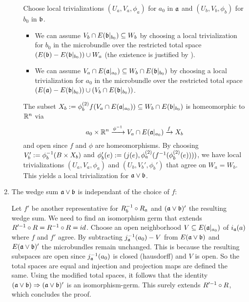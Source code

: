 \begin{myproof}
\begin{enumerate}
\begin{itemize}
            Choose local trivializations $(U_a, V_a, \phi_a)$ for $a_0$ in $\mathfrak{a}$ and $(U_b, V_b, \phi_b)$ for $b_0$ in $\mathfrak{b}$.
            \begin{itemize}
                \item We can assume $V_b \cap E(\mathfrak{b}\vert_{b_0}) \subseteq{} W_b$ by choosing a local trivialization for $b_0$ in
                the microbundle over the restricted total space $(E(\mathfrak{b}) - E(\mathfrak{b}\vert_{b_0})) \cup W_a$ (the existence is justified by ).
                \item We can assume $V_a \cap E(\mathfrak{a}\vert_{a_0}) \subseteq{} W_b \cap E(\mathfrak{b}\vert_{b_0})$ by choosing a local trivialization for $a_0$ in
                the microbundle over the restricted total space $(E(\mathfrak{a}) - E(\mathfrak{b}\vert_{b_0})) \cup (V_b \cap E(\mathfrak{b}\vert_{b_0}))$.
            \end{itemize}
            The subset $X_b := \phi_b^{(2)}f(V_a \cap E(\mathfrak{a}\vert_{a_0})) \subseteq{} W_b \cap E(\mathfrak{b}\vert_{b_0})$ is homeomorphic to $\mathbb{R}^n$ via
            \[ a_0 \times \mathbb{R}^n \xrightarrow{\phi^{-1}} V_a \cap E(\mathfrak{a}\vert_{a_0}) \xrightarrow{f} X_b \]
            and open since $f$ and $\phi$ are homeomorphisms.
            By choosing $V_b' := \phi_b^{-1}(B \times X_b)$ and $\phi_b'(e) := (j(e), \phi_a^{(2)}(f^{-1}(\phi_b^{(2)}(e))))$,
            we have local trivializations $(U_a, V_a, \phi_a)$ and $(U_b, V_b', \phi_b')$ that agree on $W_a = W_b$.
            This yields a local trivialization for $\mathfrak{a} \vee \mathfrak{b}$.
        \end{itemize}
        \item The wedge sum $\mathfrak{a} \vee \mathfrak{b}$ is independant of the choice of $f$:

        Let $f'$ be another representative for $R_b^{-1} \circ R_a$ and $(\mathfrak{a} \vee \mathfrak{b})'$ the resulting wedge sum.
        We need to find an isomorphism germ that extends $R'^{-1} \circ R = R^{-1} \circ R = id$.
        Choose an open neighborhood $V \subseteq{} E(\mathfrak{a}\vert_{a_0})$ of $i_{\mathfrak{a}}(a)$ where $f$ and $f'$ agree.
        By subtracting $j_{\mathfrak{a}}^{-1}(a_0) - V$ from $E(\mathfrak{a} \vee \mathfrak{b})$ and $E(\mathfrak{a} \vee \mathfrak{b})'$ the microbundles remain unchanged.
        This is because the resulting subspaces are open since $j_{\mathfrak{a}}^{-1}(a_0)$ is closed (hausdorff) and $V$ is open.
        So the total spaces are equal and injection and projection maps are defined the same.
        Using the modified total spaces, it follows that the identity $(\mathfrak{a} \vee \mathfrak{b}) \Rightarrow{}{} (\mathfrak{a} \vee \mathfrak{b})'$ is an isomorphism-germ.
        This surely extends $R'^{-1} \circ R$, which concludes the proof.
    \end{enumerate}
\end{myproof}